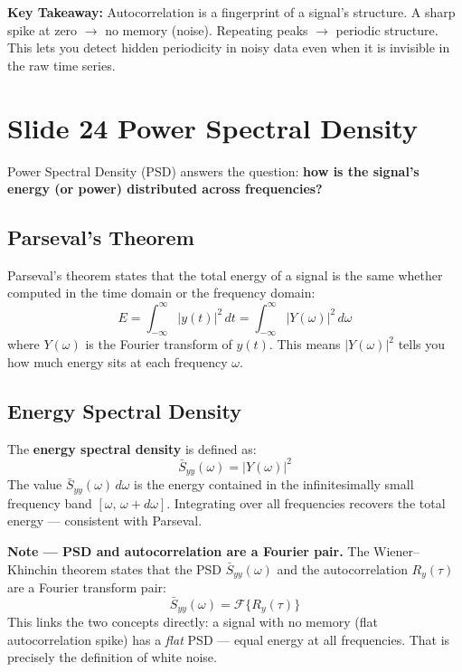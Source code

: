 \documentclass[12pt, a4paper]{article}
\begin{document}
\begin{keybox}
  \textbf{Key Takeaway:} Autocorrelation is a fingerprint of a signal's
  structure. A sharp spike at zero $\to$ no memory (noise). Repeating
  peaks $\to$ periodic structure. This lets you detect hidden periodicity
  in noisy data even when it is invisible in the raw time series.
\end{keybox}

\section*{Slide 24 \quad Power Spectral Density}

Power Spectral Density (PSD) answers the question: \textbf{how is the
signal's energy (or power) distributed across frequencies?}

\subsection*{Parseval's Theorem}

Parseval's theorem states that the total energy of a signal is the same
whether computed in the time domain or the frequency domain:
\[
  E = \int_{-\infty}^{\infty} |y(t)|^2\,dt
    = \int_{-\infty}^{\infty} |Y(\omega)|^2\,d\omega
\]
where $Y(\omega)$ is the Fourier transform of $y(t)$. This means
$|Y(\omega)|^2$ tells you how much energy sits at each frequency $\omega$.

\subsection*{Energy Spectral Density}

The \textbf{energy spectral density} is defined as:
\[
  \bar{S}_{yy}(\omega) = |Y(\omega)|^2
\]
The value $\bar{S}_{yy}(\omega)\,d\omega$ is the energy contained in
the infinitesimally small frequency band $[\omega,\, \omega + d\omega]$.
Integrating over all frequencies recovers the total energy --- consistent
with Parseval.

\begin{notebox}
  \textbf{Note --- PSD and autocorrelation are a Fourier pair.}
  The Wiener--Khinchin theorem states that the PSD $\bar{S}_{yy}(\omega)$
  and the autocorrelation $R_y(\tau)$ are a Fourier transform pair:
  \[
    \bar{S}_{yy}(\omega) = \mathcal{F}\{R_y(\tau)\}
  \]
  This links the two concepts directly: a signal with no memory
  (flat autocorrelation spike) has a \emph{flat} PSD --- equal energy
  at all frequencies. That is precisely the definition of white noise.
\end{notebox}
\end{document}
